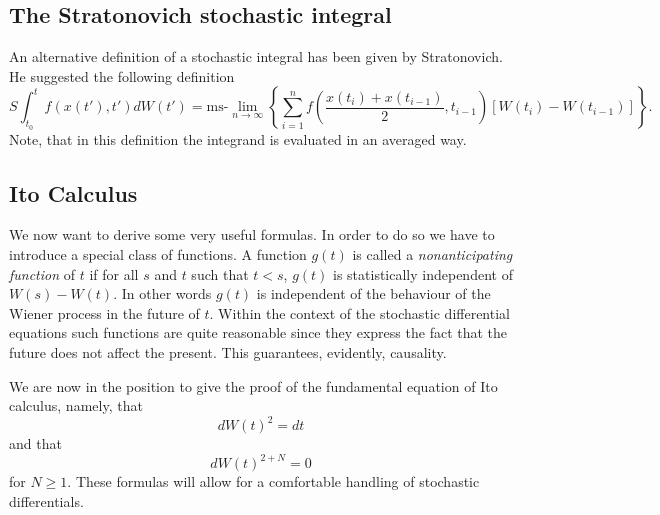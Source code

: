 \subsection{The Stratonovich stochastic integral}
\label{STRATONOVICHSUB}
An alternative definition of a stochastic  integral has been given by
Stratonovich. He suggested the following definition
\begin{equation}
\label{STRATONOVICHDEFI}
S\int_{t_0}^t f(x(t'),t') dW(t') = \text{ms-}\lim_{n \rightarrow \infty}
   \left\{ \sum_{i=1}^{n} f( \frac{x(t_{i})+ x(t_{i-1})}{2}, t_{i-1}) 
[W(t_i) - W(t_{i-1})]   \right\}.
\end{equation}
Note, that in this definition the integrand is evaluated in an
averaged way.

\subsection{Ito Calculus}
We now want to derive some very useful formulas. In order to do so 
we have to introduce a special class of functions. A function $g(t)$
is called a {\em nonanticipating function} of $t$ if for all
$s$ and $t$ such that $t<s$, $g(t)$ is statistically independent 
of $W(s)-W(t)$. In other words $g(t)$ is independent of the 
behaviour of the Wiener process in the future of $t$. Within the 
context of the stochastic differential equations such functions 
are quite reasonable since they express the fact that the future 
does not affect the present. This guarantees, evidently, 
causality.

We are now in the position to give the proof of the fundamental 
equation of Ito calculus, namely, that
\begin{equation*}
dW(t)^2 = dt 
\end{equation*}
and that
\begin{equation*}
dW(t)^{2+N} =0 
\end{equation*}
for $N \ge 1$. These formulas will allow for a comfortable 
handling of stochastic differentials.


